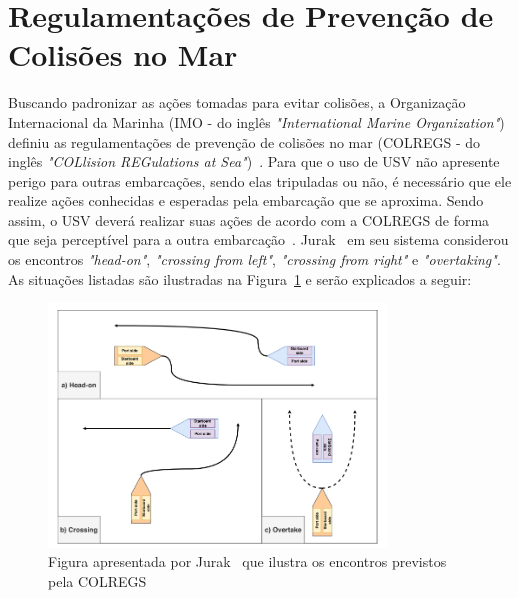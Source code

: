     \section{Regulamentações de Prevenção de Colisões no Mar}\label{subchap2:colregs}
        Buscando padronizar as ações tomadas para evitar colisões, a Organização Internacional da Marinha (IMO - do inglês \textit{"International Marine Organization"}) definiu as regulamentações de prevenção de colisões no mar (COLREGS - do inglês \textit{"COLlision REGulations at Sea"})~\cite{COLREGS}.
        Para que o uso de USV não apresente perigo para outras embarcações, sendo elas tripuladas ou não, é necessário que ele realize ações conhecidas e esperadas pela embarcação que se aproxima. Sendo assim, o USV deverá realizar suas ações de acordo com a COLREGS de forma que seja perceptível para a outra embarcação~\cite{KUWATA2014110}. Jurak~\cite{JURAK2020} em seu sistema considerou os encontros \textit{"head-on"}, \textit{"crossing from left"}, \textit{"crossing from right"} e \textit{"overtaking"}. As situações listadas são ilustradas na Figura~\ref{fig:Jurak2020_colregsSituations} e serão explicados a seguir: 
        
        \begin{figure}
            \centering
            \includegraphics[width=0.8\textwidth]{fig/chap2/colregs_situations.png}
            \caption{Figura apresentada por Jurak~\cite{JURAK2020} que ilustra os encontros previstos pela COLREGS}
            \label{fig:Jurak2020_colregsSituations}
        \end{figure}
        
